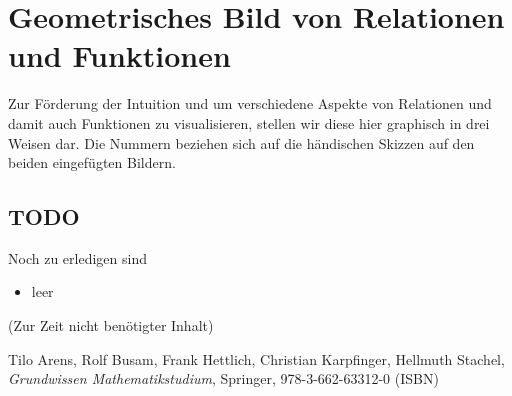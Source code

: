 \documentclass[a4paper]{amsart}
\theoremstyle{definition}
\begin{document}
\section{Geometrisches Bild von Relationen und Funktionen}

Zur Förderung der Intuition und um verschiedene Aspekte von Relationen und damit auch Funktionen zu visualisieren, stellen wir diese hier graphisch in drei Weisen dar. Die Nummern beziehen sich auf die händischen Skizzen auf den beiden eingefügten Bildern.



\begin{backup}
\section{TODO}
Noch zu erledigen sind
\begin{itemize}
   \item leer
\end{itemize}
\end{backup}

\begin{backup}
    (Zur Zeit nicht benötigter Inhalt)
\end{backup}

\begin{thebibliography}{9}

      Tilo Arens, Rolf Busam, Frank Hettlich, Christian Karpfinger, Hellmuth Stachel, \emph{Grundwissen Mathematikstudium},
      Springer, 978-3-662-63312-0 (ISBN)
      
\end{thebibliography}
\end{document}
